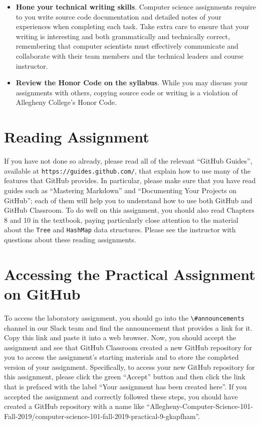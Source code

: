 \documentclass[11pt]{article}
\newcommand{\program}[1]{\lstinline{#1}}
\newcommand{\url}[1]{\lstinline{#1}}
\newcommand{\channel}[1]{\lstinline{#1}}
\begin{document}
\begin{itemize}
\item {\bf Hone your technical writing skills}. Computer science assignments
  require to you write source code documentation and detailed notes of your
  experiences when completing each task. Take extra care to ensure that your
  writing is interesting and both grammatically and technically correct,
  remembering that computer scientists must effectively communicate and
  collaborate with their team members and the technical leaders and course
  instructor.

\item {\bf Review the Honor Code on the syllabus}. While you may discuss your
  assignments with others, copying source code or writing is a violation of
  Allegheny College's Honor Code.

\end{itemize}

\vspace*{-.2in}

\section*{Reading Assignment}

If you have not done so already, please read all of the relevant ``GitHub
Guides'', available at \url{https://guides.github.com/}, that explain how to use
many of the features that GitHub provides. In particular, please make sure that
you have read guides such as ``Mastering Markdown'' and ``Documenting Your
Projects on GitHub''; each of them will help you to understand how to use both
GitHub and GitHub Classroom. To do well on this assignment, you should also read
Chapters 8 and 10 in the textbook, paying particularly close attention to the
material about the \program{Tree} and \program{HashMap} data structures. Please
see the instructor with questions about these reading assignments.

\section*{Accessing the Practical Assignment on GitHub}

To access the laboratory assignment, you should go into the
\channel{\#announcements} channel in our Slack team and find the announcement
that provides a link for it. Copy this link and paste it into a web browser.
Now, you should accept the assignment and see that GitHub Classroom created a
new GitHub repository for you to access the assignment's starting materials and
to store the completed version of your assignment. Specifically, to access your
new GitHub repository for this assignment, please click the green ``Accept''
button and then click the link that is prefaced with the label ``Your assignment
has been created here''. If you accepted the assignment and correctly followed
these steps, you should have created a GitHub repository with a name like
``Allegheny-Computer-Science-101-Fall-2019/computer-science-101-fall-2019-practical-9-gkapfham''.
\end{document}
